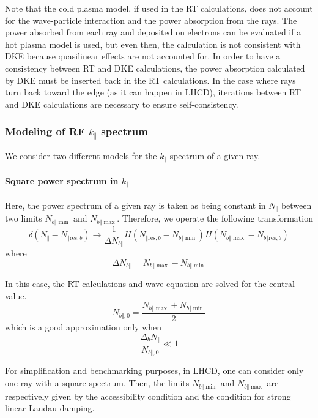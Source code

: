 Note that the cold plasma model, if used in the RT calculations, does not
account for the wave-particle interaction and the power absorption from the
rays. The power absorbed from each ray and deposited on electrons can be
evaluated if a hot plasma model is used, but even then, the calculation is not
consistent with DKE because quasilinear effects are not accounted for. In
order to have a consistency between RT and DKE calculations, the power
absorption calculated by DKE must be inserted back in the RT calculations. In
the case where rays turn back toward the edge (as it can happen in LHCD),
iterations between RT and DKE calculations are necessary to ensure self-consistency.

\subsubsection{Modeling of RF $k_{\Vert}$ spectrum}

We consider two different models for the $k_{\Vert}$ spectrum of a given ray.

\paragraph{Square power spectrum in $k_{\Vert}$}

\bigskip Here, the power spectrum of a given ray is taken as being constant in
$N_{\Vert}$ between two limits $N_{b\Vert\min}$ and $N_{b\Vert\max}$.
Therefore, we operate the following transformation
\begin{equation}
\delta\left(  N_{\Vert}-N_{\Vert\text{res},b}\right)  \rightarrow\frac
{1}{\Delta N_{b\Vert}}H\left(  N_{\Vert\text{res},b}-N_{b\Vert\min}\right)
H\left(  N_{b\Vert\max}-N_{b\Vert\text{res},b}\right)  \label{square}%
\end{equation}
where%
\begin{equation}
\Delta N_{b\Vert}=N_{b\Vert\max}-N_{b\Vert\min}%
\end{equation}

In this case, the RT calculations and wave equation are solved for the central
value.%
\begin{equation}
N_{b\Vert,0}=\frac{N_{b\Vert\max}+N_{b\Vert\min}}{2}%
\end{equation}
which is a good approximation only when
\begin{equation}
\frac{\Delta_{b}N_{\Vert}}{N_{b\Vert,0}}\ll1
\end{equation}

For simplification and benchmarking purposes, in LHCD, one can consider only
one ray with a square spectrum. Then, the limits $N_{b\Vert\min}$ and
$N_{b\Vert\max}$ are respectively given by the accessibility condition and the
condition for strong linear Laudau damping.

